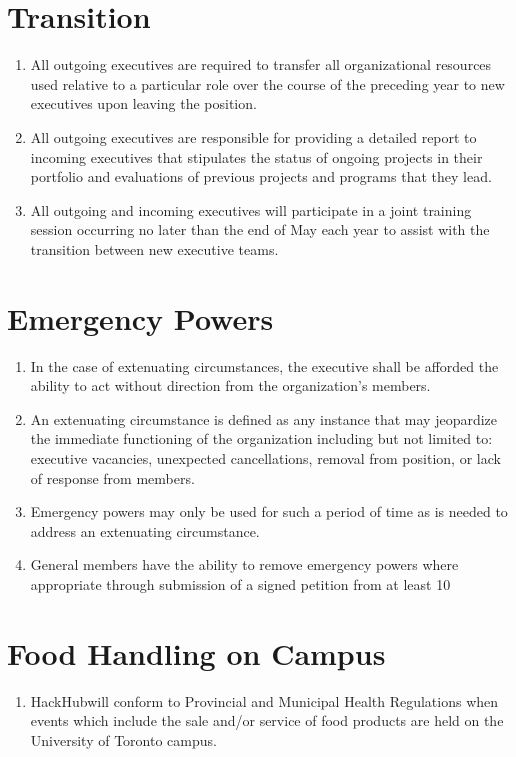 \documentclass[12pt]{article}
\newcommand{\orgname}{HackHub\space}
\begin{document}
\section{Transition}
\begin{enumerate}[{12}.1]
    \item	All outgoing executives are required to transfer all organizational resources used relative to a particular role over the course of the preceding year to new executives upon leaving the position. 
    \item	All outgoing executives are responsible for providing a detailed report to incoming executives that stipulates the status of ongoing projects in their portfolio and evaluations of previous projects and programs that they lead.
    \item	All outgoing and incoming executives will participate in a joint training session occurring no later than the end of May each year to assist with the transition between new executive teams.
\end{enumerate}


\section{Emergency Powers}
\begin{enumerate}[{13}.1]
    \item	In the case of extenuating circumstances, the executive shall be afforded the ability to act without direction from the organization’s members. 
    \item	An extenuating circumstance is defined as any instance that may jeopardize the immediate functioning of the organization including but not limited to: executive vacancies, unexpected cancellations, removal from position, or lack of response from members.
    \item	Emergency powers may only be used for such a period of time as is needed to address an extenuating circumstance. 
    \item	General members have the ability to remove emergency powers where appropriate through submission of a signed petition from at least 10%
\end{enumerate}


\section{Food Handling on Campus}
\begin{enumerate}[{14}.1]
    \item \orgname will conform to Provincial and Municipal Health Regulations when events which include the sale and/or service of food products are held on the University of Toronto campus.
\end{enumerate}
\end{document}
